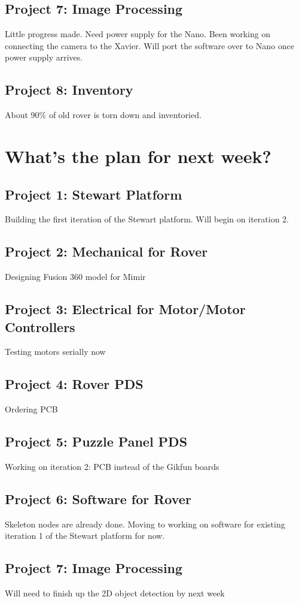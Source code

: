 \documentclass[a4paper, 10pt]{article}
\begin{document}
	\subsection*{Project 7: Image Processing}
	Little progress made. Need power supply for the Nano. Been working on connecting the camera to the Xavier. Will port the software over to Nano once power supply arrives.
	
	\subsection*{Project 8: Inventory}
	About 90\% of old rover is torn down and inventoried.	
\section*{What's the plan for next week?}
	\subsection*{Project 1: Stewart Platform}
	Building the first iteration of the Stewart platform. Will begin on iteration 2.
	
	\subsection*{Project 2: Mechanical for Rover}
	Designing Fusion 360 model for Mimir
	
	\subsection*{Project 3: Electrical for Motor/Motor Controllers}	
	Testing motors serially now
	
	\subsection*{Project 4: Rover PDS}	
	Ordering PCB
		
	\subsection*{Project 5: Puzzle Panel PDS}
	Working on iteration 2: PCB instead of the Gikfun boards
	
	\subsection*{Project 6: Software for Rover}
	Skeleton nodes are already done. Moving to working on software for existing iteration 1 of the Stewart platform for now.
		
	\subsection*{Project 7: Image Processing}
	Will need to finish up the 2D object detection by next week
\end{document}

